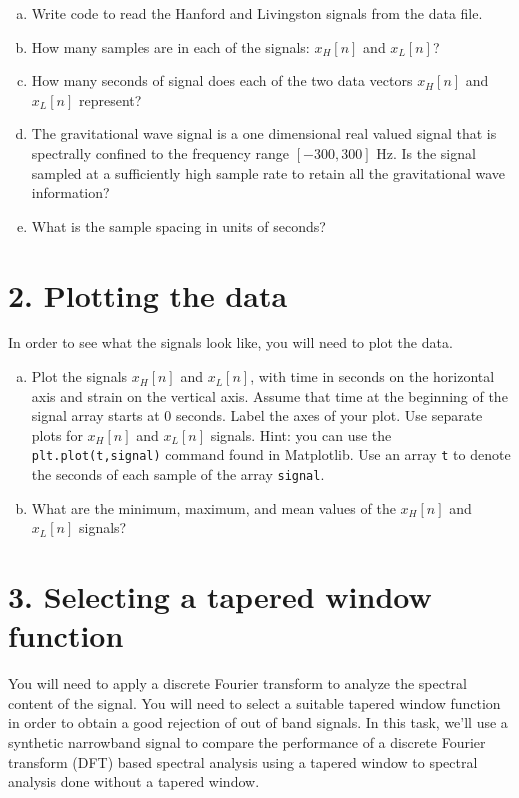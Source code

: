\begin{enumerate}[a)]

\item Write code to read the Hanford and Livingston signals from the data file.
  
\item How many samples are in each of the signals: $x_H[n]$ and $x_L[n]$?
  
\item How many seconds of signal does each of the two data vectors $x_H[n]$ and $x_L[n]$ represent?
  
\item The gravitational wave signal is a one dimensional real valued
  signal that is spectrally confined to the frequency range $[-300,
    300]$ Hz. Is the signal sampled at a sufficiently high sample rate
  to retain all the gravitational wave information?
  
\item What is the sample spacing in units of seconds?
\end{enumerate}

\section{2. Plotting the data}

In order to see what the signals look like, you will need to plot the data.
\begin{enumerate}[a)]
\item Plot the signals $x_H[n]$ and $x_L[n]$, with time in seconds on
  the horizontal axis and strain on the vertical axis. Assume that
  time at the beginning of the signal array starts at 0 seconds. Label
  the axes of your plot. Use separate plots for $x_H[n]$ and $x_L[n]$
  signals. Hint: you can use the \verb|plt.plot(t,signal)| command found in Matplotlib. Use an array \verb|t| to denote the seconds of each sample of the array \verb|signal|.
  
\item What are the minimum, maximum, and mean values of the $x_H[n]$ and $x_L[n]$ signals?
  
\end{enumerate}

\section{3. Selecting a tapered window function}

You will need to apply a discrete Fourier transform to analyze the
spectral content of the signal. You will need to select a suitable
tapered window function in order to obtain a good rejection of out of
band signals. In this task, we'll use a synthetic narrowband signal to
compare the performance of a discrete Fourier transform (DFT) based spectral
analysis using a tapered window to spectral analysis done without a
tapered window.

